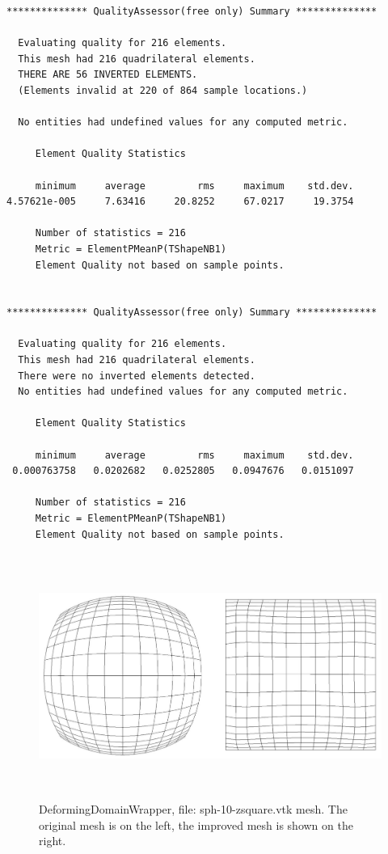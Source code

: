 \begin{verbatim}
************** QualityAssessor(free only) Summary **************

  Evaluating quality for 216 elements.
  This mesh had 216 quadrilateral elements.
  THERE ARE 56 INVERTED ELEMENTS.
  (Elements invalid at 220 of 864 sample locations.)

  No entities had undefined values for any computed metric.

     Element Quality Statistics

     minimum     average         rms     maximum    std.dev.
4.57621e-005     7.63416     20.8252     67.0217     19.3754

     Number of statistics = 216
     Metric = ElementPMeanP(TShapeNB1)
     Element Quality not based on sample points.


************** QualityAssessor(free only) Summary **************

  Evaluating quality for 216 elements.
  This mesh had 216 quadrilateral elements.
  There were no inverted elements detected.
  No entities had undefined values for any computed metric.

     Element Quality Statistics

     minimum     average         rms     maximum    std.dev.
 0.000763758   0.0202682   0.0252805   0.0947676   0.0151097

     Number of statistics = 216
     Metric = ElementPMeanP(TShapeNB1)
     Element Quality not based on sample points.
\end{verbatim}


\begin{figure}[htbp]
\begin{center}
    \includegraphics[height=80mm]{figures/sph-10-zsquare}
    \caption{DeformingDomainWrapper, file: sph-10-zsquare.vtk mesh. The original mesh is on the left, the improved mesh is shown on the right.}
    \label{fig:sph-10-zsquare}
\end{center}
\end{figure}
